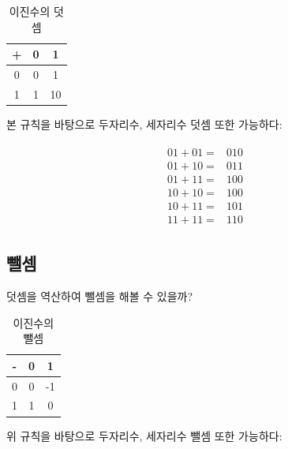 \documentclass[a4paper,12pt]{book}
\begin{document}
\begin{appendices}
\begin{table}[H]
        \caption{이진수의 덧셈}
        \label{Tab:addition-binary}

        \begin{tabular}{ || c || c | c || }
            \hline
            + & 0  & 1  \\
            \hline\hline
            0 & 0  & 1  \\
            \hline
            1 & 1  & 10 \\
            \hline
        \end{tabular}
    \end{table}

    본 규칙을 바탕으로 두자리수, 세자리수 덧셈 또한 가능하다:

    \begin{align}
    \begin{split}
        01 + 01 =& 010 \\
        01 + 10 =& 011 \\
        01 + 11 =& 100 \\
        10 + 10 =& 100 \\
        10 + 11 =& 101 \\
        11 + 11 =& 110
    \end{split}
    \end{align}


\subsection{뺄셈}
\label{sec:substitution-binary}

    덧셈을 역산하여 뺄셈을 해볼 수 있을까?

    \begin{table}[H]
        \centering

        \caption{이진수의 뺄셈}
        \label{Tab:substitution-binary}

        \begin{tabular}{ || c || c | c || }
            \hline
            - & 0  & 1  \\
            \hline\hline
            0 & 0  & -1 \\
            \hline
            1 & 1  & 0  \\
            \hline
        \end{tabular}
    \end{table}

    위 규칙을 바탕으로 두자리수, 세자리수 뺄셈 또한 가능하다:


\end{appendices}
\end{document}
